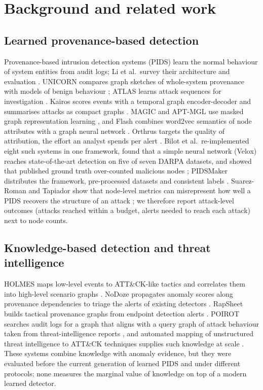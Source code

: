 \documentclass[acmlarge,screen,review]{acmart}
\begin{document}
\section{Background and related work}\label{sec:related}
\subsection{Learned provenance-based detection}
Provenance-based intrusion detection systems (PIDS) learn the normal behaviour of system entities from audit logs;
Li et al.\ survey their architecture and evaluation \cite{li2021provsurvey}. UNICORN compares graph sketches of
whole-system provenance with models of benign behaviour \cite{han2020unicorn}; ATLAS learns attack sequences for
investigation \cite{alsaheel2021atlas}. Kairos scores events with a temporal graph encoder-decoder and summarises
attacks as compact graphs \cite{cheng2024kairos}. MAGIC and APT-MGL use masked graph representation learning
\cite{jia2024magic,ren2025aptmgl}, and Flash combines word2vec semantics of node attributes with a graph neural
network \cite{rehman2024flash}. Orthrus targets the quality of attribution, the effort an analyst spends per alert
\cite{jiang2025orthrus}. Bilot et al.\ re-implemented eight such systems in one framework, found that a simple neural
network (Velox) reaches state-of-the-art detection on five of seven DARPA datasets, and showed that published ground
truth over-counted malicious nodes \cite{bilot2025simpler}; PIDSMaker distributes the framework, pre-processed datasets
and consistent labels \cite{pidsmaker2026}. Suarez-Roman and Tapiador show that node-level metrics can misrepresent
how well a PIDS recovers the structure of an attack \cite{suarezroman2025structure}; we therefore report attack-level
outcomes (attacks reached within a budget, alerts needed to reach each attack) next to node counts.

\subsection{Knowledge-based detection and threat intelligence}
HOLMES maps low-level events to ATT\&CK-like tactics and correlates them into high-level scenario graphs
\cite{milajerdi2019holmes}. NoDoze propagates anomaly scores along provenance dependencies to triage the alerts of
existing detectors \cite{hassan2019nodoze}. RapSheet builds tactical provenance graphs from endpoint detection alerts
\cite{hassan2020rapsheet}. POIROT searches audit logs for a graph that aligns with a query graph of attack behaviour
taken from threat-intelligence reports \cite{milajerdi2019poirot}, and automated mapping of unstructured threat
intelligence to ATT\&CK techniques supplies such knowledge at scale \cite{li2024ttpmapping}. These systems combine
knowledge with anomaly evidence, but they were evaluated before the current generation of learned PIDS and under
different protocols; none measures the marginal value of knowledge on top of a modern learned detector.
\end{document}
